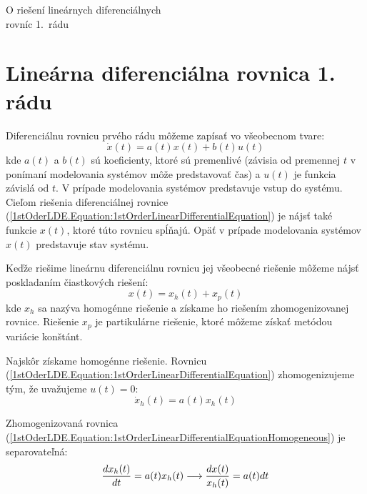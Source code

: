 \documentclass[a4paper, 10pt, ]{article}
\begin{document}
\begin{flushleft}
	O riešení lineárnych diferenciálnych \\ rovníc 1.~rádu
\end{flushleft}

\bigskip

\normalsize
\normalfont



\section{Lineárna diferenciálna rovnica 1. rádu}

Diferenciálnu rovnicu prvého rádu môžeme zapísať vo všeobecnom tvare:
\begin{equation}
    \label{1stOderLDE.Equation:1stOrderLinearDifferentialEquation}
    \dot{x}(t) = a(t) x(t) + b(t) u(t)
\end{equation}
kde $a(t)$ a $b(t)$ sú koeficienty, ktoré sú premenlivé (závisia od premennej $t$ v ponímaní modelovania systémov môže predstavovať čas) a $u(t)$ je funkcia závislá od $t$. V prípade modelovania systémov predstavuje vstup do systému. Cieľom riešenia diferenciálnej rovnice (\ref{1stOderLDE.Equation:1stOrderLinearDifferentialEquation}) je nájsť také funkcie $x(t)$, ktoré túto rovnicu spĺňajú. Opäť v prípade modelovania systémov $x(t)$ predstavuje stav systému.

Keďže riešime lineárnu diferenciálnu rovnicu jej všeobecné riešenie môžeme nájsť poskladaním čiastkových riešení:
\begin{equation}
    \label{1stOderLDE.Equation:SolutionLinearCombination}
    x(t) = x_h(t) + x_p(t)
\end{equation}
kde $x_h$ sa nazýva homogénne riešenie a získame ho riešením zhomogenizovanej rovnice. Riešenie $x_p$ je partikulárne riešenie, ktoré môžeme získať metódou variácie konštánt.

Najskôr získame homogénne riešenie. Rovnicu (\ref{1stOderLDE.Equation:1stOrderLinearDifferentialEquation}) zhomogenizujeme tým, že uvažujeme $u(t) = 0$:
\begin{equation}
    \label{1stOderLDE.Equation:1stOrderLinearDifferentialEquationHomogeneous}
    \dot{x}_h(t) = a(t) x_h(t)
\end{equation}

\noindent Zhomogenizovaná rovnica (\ref{1stOderLDE.Equation:1stOrderLinearDifferentialEquationHomogeneous}) je separovateľná:
\begin{equation}
    \label{1stOderLDE.Equation:1stOrderLinearDifferentialEquationHomogeneousSeparated}
    \frac{d x_h(t)}{d t} = a(t) x_h(t) \longrightarrow \frac{dx(t)}{x_h(t)} = a(t)dt
\end{equation}
\end{document}
